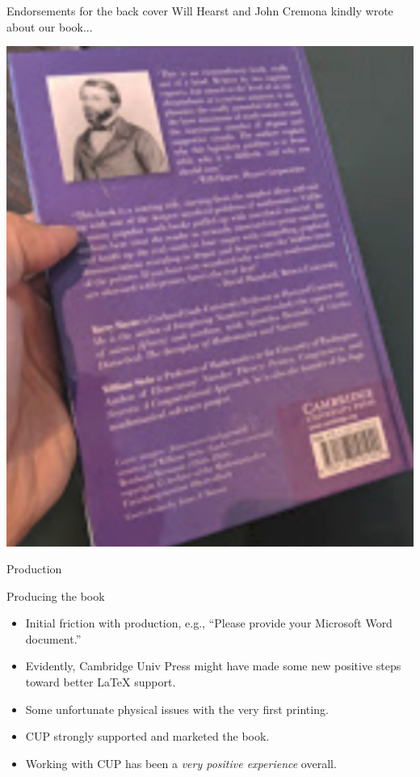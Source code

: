 \documentclass{beamer}
\begin{document}
\begin{frame}{Endorsements for the back cover}
Will Hearst and John Cremona kindly wrote about our book...

  \begin{center}
    \includegraphics[height=.4\textheight]{pics/cover-back}
  \end{center}
\end{frame}

\begin{frame}{Production}
\begin{block}{Producing the book}
  \begin{itemize}
  \item Initial friction with production, e.g., ``Please provide your Microsoft Word document.''
    \item Evidently, Cambridge Univ Press might have made some new positive steps toward better \LaTeX{} support.
    \item Some unfortunate physical issues with the very first printing.
    \item CUP strongly supported and marketed the book.
    \item Working with CUP has been a {\em very positive experience} overall.
  \end{itemize}
\end{block}
\end{frame}
\end{document}
